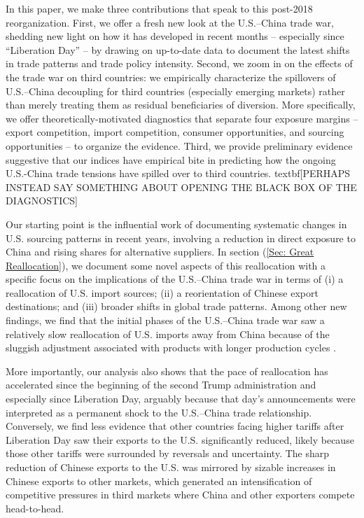 \documentclass[english,12pt]{article}
\theoremstyle{definition}
\let\oldref\ref
\renewcommand{\ref}[1]{(\oldref{#1})}
\begin{document}
In this paper, we make three contributions that speak to this post-2018
reorganization. First, we offer a fresh new look at the U.S.--China trade
war, shedding new light on how it has developed in recent months --
especially since ``Liberation Day'' -- by drawing on up-to-date data to
document the latest shifts in trade patterns and trade policy intensity. Second,
we zoom in on the effects of the trade war on third countries: we empirically
characterize the spillovers of U.S.--China decoupling for third countries
(especially emerging markets) rather than merely treating them as residual
beneficiaries of diversion. More specifically, we offer theoretically-motivated
diagnostics that separate four exposure margins -- export competition, import 
competition, consumer opportunities, and sourcing opportunities -- to organize the evidence. 
Third, we provide preliminary evidence suggestive that our indices have empirical
bite in predicting how the ongoing U.S.-China trade tensions have spilled over 
to third countries. textbf{[PERHAPS INSTEAD SAY SOMETHING ABOUT OPENING THE 
BLACK BOX OF THE DIAGNOSTICS]}


Our starting point is the influential work of \cite%
{AlfaroChor2023JacksonHoleGreatReallocation} documenting systematic changes
in U.S. sourcing patterns in recent years, involving a reduction in direct exposure to China
and rising shares for alternative suppliers. In section \ref{Sec: Great
Reallocation}, we document some novel aspects of this reallocation with a
specific focus on the implications of the U.S.--China trade war in terms of (i)
a reallocation of U.S. import sources; (ii) a reorientation of Chinese export
destinations; and (iii) broader shifts in global trade patterns. Among other new findings, we find 
that the initial phases of the U.S.--China trade war saw a relatively slow reallocation of 
U.S. imports away from China because of the sluggish adjustment associated with products with 
longer production cycles \citep[cf.][]{antras2025measuring}. 

More importantly, our analysis also shows that the pace of reallocation has 
accelerated since the beginning of the 
second Trump administration and especially since Liberation Day, arguably because
that day's announcements were interpreted as a permanent shock to the U.S.--China trade 
relationship. Conversely, we find less evidence that other countries facing higher 
tariffs after Liberation Day saw their exports to the U.S. significantly reduced,
likely because those other tariffs were surrounded by reversals and uncertainty. The sharp 
reduction of Chinese exports to the U.S. was mirrored by sizable increases in Chinese exports 
to other markets, which generated an intensification of competitive pressures in third markets 
where China and other exporters compete head-to-head.
\end{document}
